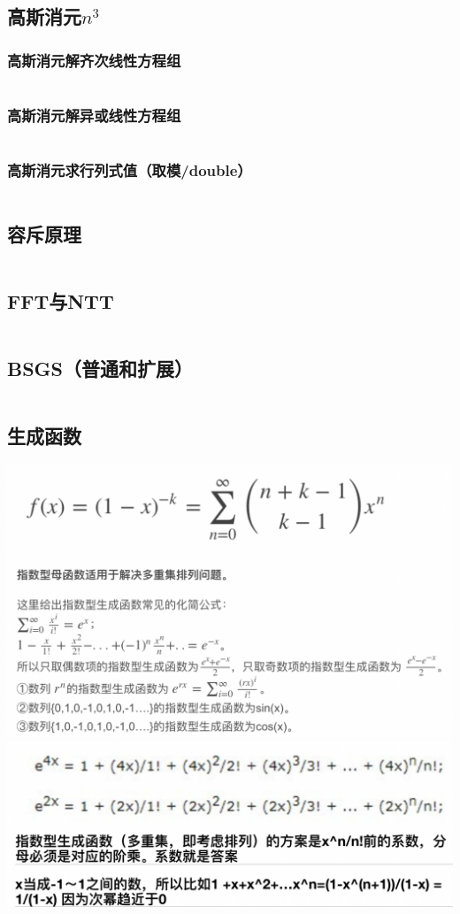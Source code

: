 \documentclass[a4paper,11pt]{article}
\begin{document}
\subsection{高斯消元$n^3$} %
\subsubsection{高斯消元解齐次线性方程组} %
\inputminted[breaklines]{c++}{数论/高斯消元.cpp}
\subsubsection{高斯消元解异或线性方程组} %
\inputminted[breaklines]{c++}{数论/高斯消元解异或线性方程组.cpp}
\subsubsection{高斯消元求行列式值（取模/double）} %
\inputminted[breaklines]{c++}{数论/高斯消元求行列式值.cpp}
\subsection{容斥原理} %
\inputminted[breaklines]{c++}{数论/容斥原理.cpp}
\subsection{FFT与NTT} %
\inputminted[breaklines]{c++}{数论/FFT.cpp}
\subsection{BSGS（普通和扩展）} %
\inputminted[breaklines]{c++}{数论/BSGS.cpp}
\subsection{生成函数} %
\includegraphics[scale=0.6]{数论/生成函数1.png}
\includegraphics[scale=0.6]{数论/生成函数2.png}
\end{document}
